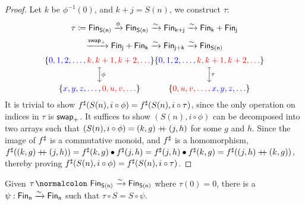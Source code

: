 \begin{proof}
    Let $k$ be $\phi^{-1}(0)$, and $k + j = S(n)$, we construct $\tau$:
    \[
        \tau \defeq \Fin[S(n)] \xto{\phi} \Fin[S(n)] \xto{\sim} \Fin[k+j] \xto{\sim} \Fin[k] + \Fin[j]
    \]
    \[
        \xto{\term{swap}_{+}} \Fin[j] + \Fin[k] \xto{\sim} \Fin[j+k] \xto{\sim} \Fin[S(n)]
    \]
    \[
        \begin{tikzcd}[ampersand replacement=\&,cramped]
            {\{\color{blue}0, 1, 2, \dots, \color{red}k, k+1, k+2, \dots \color{black}\}} \\
            {\{\color{blue}x, y, z, \dots, \color{red}0, u, v, \dots \color{black}\}}
            \arrow["\phi", maps to, from=1-1, to=2-1]
        \end{tikzcd}
        \\
        \begin{tikzcd}[ampersand replacement=\&,cramped]
            {\{\color{blue}0, 1, 2, \dots, \color{red}k, k+1, k+2, \dots \color{black}\}} \\
            {\{\color{red}0, u, v, \dots, \color{blue}x, y, z, \dots \color{black}\}}
            \arrow["\tau", maps to, from=1-1, to=2-1]
        \end{tikzcd}
    \]
    It is trivial to show ${f}^{\sharp}(S(n), i \circ \phi) = {f}^{\sharp}(S(n), i \circ \tau)$, since the only
    operation on indices in $\tau$ is $\operatorname{\mathsf{swap}}_{+}$. It suffices to show $(S(n), i \circ \phi)$
    can be decomposed into two arrays such that $(S(n), i \circ \phi) = (k, g) \mathbin{+\kern -0.4em+} (j, h)$
    for some $g$ and $h$. Since the image of ${f}^{\sharp}$ is a commutative monoid, and ${f}^{\sharp}$ is a homomorphism,
    ${f}^{\sharp}((k, g) \mathbin{+\kern -0.4em+} (j, h)) = {f}^{\sharp}(k, g) \mathbin{\bullet} {f}^{\sharp}(j, h) = {f}^{\sharp}(j, h) \mathbin{\bullet} {f}^{\sharp}(k, g) =
        {f}^{\sharp}((j, h) \mathbin{+\kern -0.4em+} (k, g))$, thereby proving ${f}^{\sharp}(S(n), i \circ \phi) = {f}^{\sharp}(S(n), i \circ \tau)$.

\end{proof}

\begin{lemma}\label{bag:punch}
    Given $\tau\colon \Fin[S(n)]\xto{\sim}\Fin[S(n)]$ where $\tau(0) = 0$,
    there is a $\psi : \Fin[n] \xto{\sim} \Fin[n]$ such that $\tau \circ S = S \circ \psi$.
\end{lemma}

